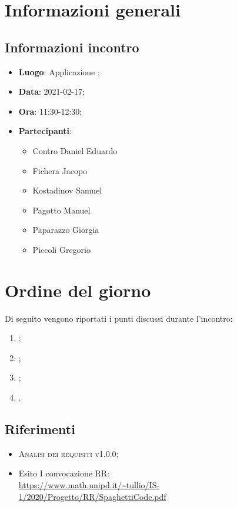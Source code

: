 \documentclass{article}
\begin{document}


\section{Informazioni generali}
\label{sec:info_generali}

\subsection{Informazioni incontro}
\label{sub:info_incontro}

\begin{itemize}
	\item \textbf{Luogo}: Applicazione ;
	\item \textbf{Data}: 2021-02-17;
	\item \textbf{Ora}: 11:30-12:30;
	\item \textbf{Partecipanti}:
	\begin{itemize}
		\item Contro Daniel Eduardo
		\item Fichera Jacopo
		\item Kostadinov Samuel
		\item Pagotto Manuel
		\item Paparazzo Giorgia
		\item Piccoli Gregorio
	\end{itemize}
\end{itemize}

\section{Ordine del giorno}%
\label{sec:ordine_del_giorno}

Di seguito vengono riportati i punti discussi durante l'incontro:
\begin{enumerate}
	\item {};
	\item {};
	\item {};
	\item {}.
\end{enumerate}


\subsection{Riferimenti}%
\label{sub:riferimenti}
\begin{itemize}
    \item \textsc{Analisi dei requisiti} v1.0.0;
	\item Esito I convocazione RR: \\
		\url{https://www.math.unipd.it/~tullio/IS-1/2020/Progetto/RR/SpaghettiCode.pdf}
\end{itemize}
\end{document}
